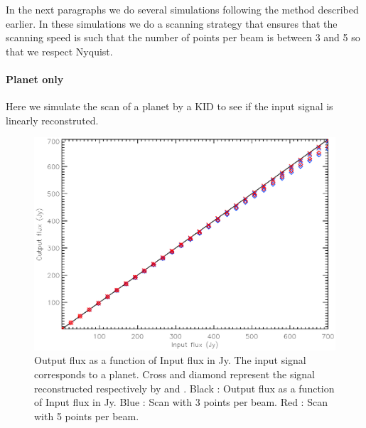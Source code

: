 In the next paragraphs we do several simulations following the method described earlier. In these simulations we do a scanning strategy that ensures that the scanning speed is such that the number of points per beam is between 3 and 5 so that we respect Nyquist.


\paragraph{Planet only \\}

Here we simulate the scan of a planet by a KID to see if the input signal is linearly reconstruted.

\begin{figure}[h]
\center
	\includegraphics[scale=0.5]{Figures/NL-planet.eps}
	\caption{Output flux as a function of Input flux in Jy. 
	The input signal corresponds to a planet. Cross and diamond represent the signal reconstructed respectively by \cf and \rf. Black : Output flux as a function of Input flux in Jy. Blue : Scan with 3 points per beam. Red : Scan with 5 points per beam.}
	\label{fig:nl-planet}
\end{figure}

